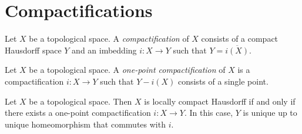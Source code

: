 \section{Compactifications}

\begin{definition}[Compactification]
    Let $X$ be a topological space. A \emph{compactification} of $X$ consists of a compact Hausdorff
    space $Y$ and an imbedding $i : X \rightarrow Y$ such that $Y = \overline{i(X)}$.
\end{definition}

\begin{definition}
    Let $X$ be a topological space. A \emph{one-point compactification} of $X$ is a compactification
    $i : X \rightarrow Y$ such that $Y - i(X)$ consists of a single point.
\end{definition}

\begin{theorem}
    Let $X$ be a topological space. Then $X$ is locally compact Hausdorff if and only if there exists
    a one-point compactification $i : X \rightarrow Y$. In this case,
    $Y$ is unique up to unique homeomorphism that commutes with $i$.
\end{theorem}

